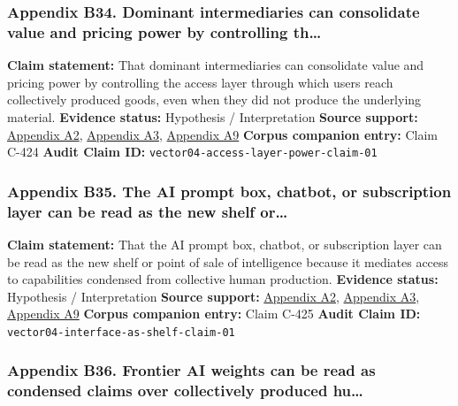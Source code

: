 \documentclass[
  american,
  11pt,
  letterpaper,
]{article}
\begin{document}
\subsubsection{Appendix B34. Dominant intermediaries can consolidate
value and pricing power by controlling
th\ldots{}}\label{appendix-b34-dominant-intermediaries-can-consolidate-value-and-pricing-power-by-controlling-th}

\textbf{Claim statement:} That dominant intermediaries can consolidate
value and pricing power by controlling the access layer through which
users reach collectively produced goods, even when they did not produce
the underlying material. \textbf{Evidence status:} Hypothesis /
Interpretation \textbf{Source support:}
\hyperref[appendix-a2-language-models-are-unsupervised-multitask-learners]{Appendix
A2},
\hyperref[appendix-a3-reddit-strikes-60m-deal-allowing-google-to-train-ai-models-on-its-posts-unveils-ipo-plans]{Appendix
A3},
\hyperref[appendix-a9-the-problem-with-annotation-human-labour-and-outsourcing-between-france-and-madagascar]{Appendix
A9} \textbf{Corpus companion entry:} Claim C-424 \textbf{Audit Claim
ID:} \texttt{vector04-access-layer-power-claim-01}

\subsubsection{Appendix B35. The AI prompt box, chatbot, or subscription
layer can be read as the new shelf
or\ldots{}}\label{appendix-b35-the-ai-prompt-box-chatbot-or-subscription-layer-can-be-read-as-the-new-shelf-or}

\textbf{Claim statement:} That the AI prompt box, chatbot, or
subscription layer can be read as the new shelf or point of sale of
intelligence because it mediates access to capabilities condensed from
collective human production. \textbf{Evidence status:} Hypothesis /
Interpretation \textbf{Source support:}
\hyperref[appendix-a2-language-models-are-unsupervised-multitask-learners]{Appendix
A2},
\hyperref[appendix-a3-reddit-strikes-60m-deal-allowing-google-to-train-ai-models-on-its-posts-unveils-ipo-plans]{Appendix
A3},
\hyperref[appendix-a9-the-problem-with-annotation-human-labour-and-outsourcing-between-france-and-madagascar]{Appendix
A9} \textbf{Corpus companion entry:} Claim C-425 \textbf{Audit Claim
ID:} \texttt{vector04-interface-as-shelf-claim-01}

\subsubsection{Appendix B36. Frontier AI weights can be read as
condensed claims over collectively produced
hu\ldots{}}\label{appendix-b36-frontier-ai-weights-can-be-read-as-condensed-claims-over-collectively-produced-hu}
\end{document}
